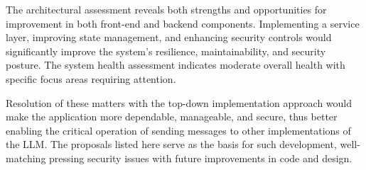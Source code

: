 \documentclass[sigconf]{acmart}
\begin{document}
The architectural assessment reveals both strengths and opportunities for improvement in both front-end and backend components. Implementing a service layer, improving state management, and enhancing security controls would significantly improve the system's resilience, maintainability, and security posture. The system health assessment indicates moderate overall health with specific focus areas requiring attention.

Resolution of these matters with the top-down implementation approach would make the application more dependable, manageable, and secure, thus better enabling the critical operation of sending messages to other implementations of the LLM. The proposals listed here serve as the basis for such development, well-matching pressing security issues with future improvements in code and design.


\appendix
\end{document}
